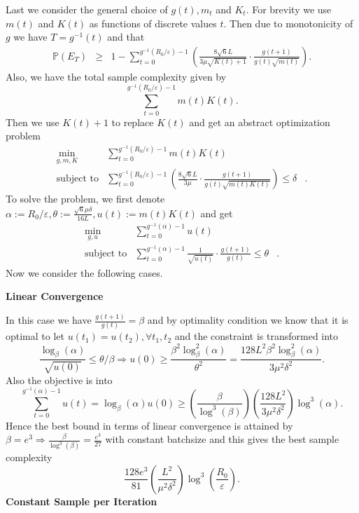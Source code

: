 \documentclass{article}
\newcommand{\assign}{:=}
\newcommand{\cdummy}{\cdot}
\newcommand{\tmstrong}[1]{\textbf{#1}}
\begin{document}
Last we consider the general choice of $g (t), m_t$ and $K_t$. For brevity we
use $m (t)$ and $K (t)$ as functions of discrete values $t$. Then due to
monotonicity of $g$ we have $T = g^{- 1} (t)$ and that
\begin{eqnarray*}
  \mathbb{P} (E_T) & \geq & 1 - \sum_{t = 0}^{g^{- 1} (R_0 / \varepsilon) - 1}
  \left( \frac{8 \sqrt{6} L}{3 \mu \sqrt{K (t) + 1}} \cdummy \frac{g (t +
  1)}{g (t) \sqrt{m (t)}} \right) .
\end{eqnarray*}
Also, we have the total sample complexity given by
\[ \sum_{t = 0}^{g^{- 1} (R_0 / \varepsilon) - 1} m (t) K (t) . \]
Then we use $K (t) + 1$ to replace $K (t)$ and get an abstract optimization
problem
\begin{eqnarray*}
  \min_{g, m, K} & \sum_{t = 0}^{g^{- 1} (R_0 / \varepsilon) - 1} m (t) K (t)
  & \\
  \text{subject to} & \sum_{t = 0}^{g^{- 1} (R_0 / \varepsilon) - 1} \left(
  \frac{8 \sqrt{6} L}{3 \mu} \cdummy \frac{g (t + 1)}{g (t) \sqrt{m (t) K
  (t)}} \right) \leq \delta & .
\end{eqnarray*}
To solve the problem, we first denote $\alpha \assign R_0 / \varepsilon,
\theta \assign \frac{\sqrt{6} \mu \delta}{16 L}, u (t) \assign m (t) K (t)$
and get
\begin{eqnarray*}
  \min_{g, u} & \sum_{t = 0}^{g^{- 1} (\alpha) - 1} u (t) & \\
  \text{subject to} & \sum_{t = 0}^{g^{- 1} (\alpha) - 1} \frac{1}{\sqrt{u
  (t)}} \cdummy \frac{g (t + 1)}{g (t)} \leq \theta & .
\end{eqnarray*}
Now we consider the following cases.

{\tmstrong{Linear Convergence}}

In this case we have $\frac{g (t + 1)}{g (t)} = \beta$ and by optimality
condition we know that it is optimal to let $u (t_1) = u (t_2), \forall t_1,
t_2$ and the constraint is transformed into
\[ \frac{\log_{\beta} (\alpha)}{\sqrt{u (0)}} \leq \theta / \beta \Rightarrow
   u (0) \geq \frac{\beta^2 \log^2_{\beta} (\alpha)}{\theta^2} = \frac{128 L^2
   \beta^2 \log^2_{\beta} (\alpha)}{3 \mu^2 \delta^2} . \]
Also the objective is into
\[ \sum_{t = 0}^{g^{- 1} (\alpha) - 1} u (t) = \log_{\beta} (\alpha) u (0)
   \geq \left( \frac{\beta}{\log^3 (\beta)} \right) \left( \frac{128 L^2}{3
   \mu^2 \delta^2} \right) \log^3 (\alpha) . \]
Hence the best bound in terms of linear convergence is attained by $\beta =
e^3 \Rightarrow \frac{\beta}{\log^3 (\beta)} = \frac{e^3}{27}$ with constant
batchsize and this gives the best sample complexity
\[ \frac{128 e^3}{81} \left( \frac{L^2}{\mu^2 \delta^2} \right) \log^3 \left(
   \frac{R_0}{\varepsilon} \right) . \]
{\tmstrong{Constant Sample per Iteration}}
\end{document}
